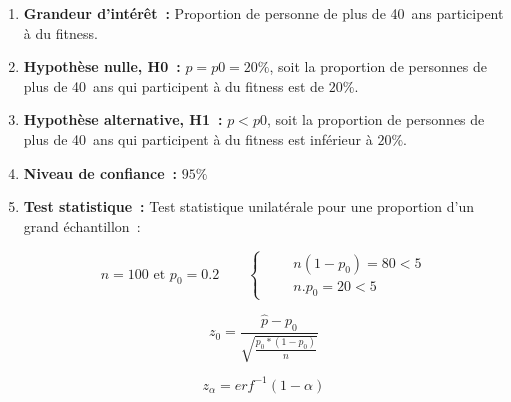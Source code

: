 \begin{enumerate}
    \item \textbf{Grandeur d'intérêt~:} Proportion de personne de plus de 40~ans participent à du fitness.
    \vspace{.1cm}
   \item \textbf{Hypothèse nulle, H0~:} $p = p0 = 20\%$, soit la proportion de personnes de plus de 40~ans qui participent à du fitness est de $20\%$.
    \vspace{.1cm}
   \item \textbf{Hypothèse alternative, H1~:} $p < p0$, soit la proportion de personnes de plus de 40~ans qui participent à du fitness est inférieur à $20\%$.
    \vspace{.1cm}
   \item \textbf{Niveau de confiance~:} $95\%$
    \vspace{.1cm}
   \item \textbf{Test statistique~:}
        Test statistique unilatérale pour une proportion d'un grand échantillon~: 

        \begin{equation*}
            n=100 \text{ et } p_{0}=0.2 \qquad
            \left\{ \qquad
            \begin{aligned}
                n(1-p_{0}) = 80 < 5 \\
                n.p_{0}=20 < 5
            \end{aligned}
            \right .
        \end{equation*}

        \begin{figure}[!h]
            \centering
            \begin{minipage}{.48\linewidth}
                \begin{equation}
                    z_{0} = \frac{\hat{p} - p_{0}}{\sqrt{\frac{p_{0}*(1-p_{0})}{n}}}
                    \label{eq:test_norm_var_inconnue}
                \end{equation}
            \end{minipage}\hfill\vline
            \begin{minipage}{.48\linewidth}
                \begin{equation}
                    z_{\alpha} = erf^{-1}(1 - \alpha) 
                    \label{eq:p-valeur_test_norm_var_inconnue}
                \end{equation}
            \end{minipage}
        \end{figure}


\end{enumerate}
